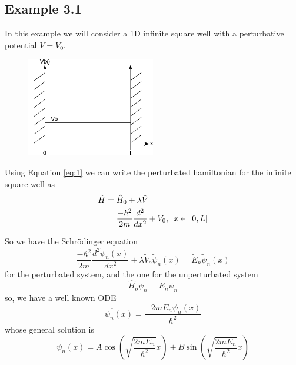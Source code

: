 \documentclass[12pt]{article}
\begin{document}
\subsection{Example 3.1}
In this example we will consider a 1D infinite square well with a perturbative potential $V=V_0$.
\begin{figure}[h]
  \centering
\includegraphics[width=0.5\textwidth]{../Figures/path469.pdf}
\end{figure}
Using Equation \ref{eq:1} we can write the perturbated hamiltonian for the infinite square well as 
\begin{align}
	\tilde{H} & = \hat{H}_0 + \lambda \hat{V}\nonumber\\
	& = \frac{-\hbar^2}{2m}\frac{d^2}{dx^2} + V_0,\,\,\,x \in\,\text[0,L]
\end{align}

So we have the Schr\"odinger equation
\begin{equation*}
	\frac{-\hbar^2}{2m}\frac{d^2 \tilde{\psi}_n(x)}{dx^2} + \lambda \tilde{V}_o \tilde{\psi}_n(x) 
	= \tilde{E}_n \tilde{\psi}_n(x)
\end{equation*}
for the perturbated system,
and the one for the unperturbated system
\begin{equation*}
	\hat{H}_o \psi_n = E_n \psi_n
\end{equation*}
so, we have a well known ODE
\begin{equation}
  \psi^{''}_n(x) = \frac{-2mE_n \psi_n(x)}{\hbar^2} 
\end{equation}
whose general solution is
\begin{equation}
 \psi_n (x) = A \cos\left( 
	\sqrt{\frac{2m E_n}{\hbar^2}}x\right) + B \sin\left( 
	\sqrt{\frac{2m E_n}{\hbar^2}}x\right) 
\end{equation}
\end{document}
